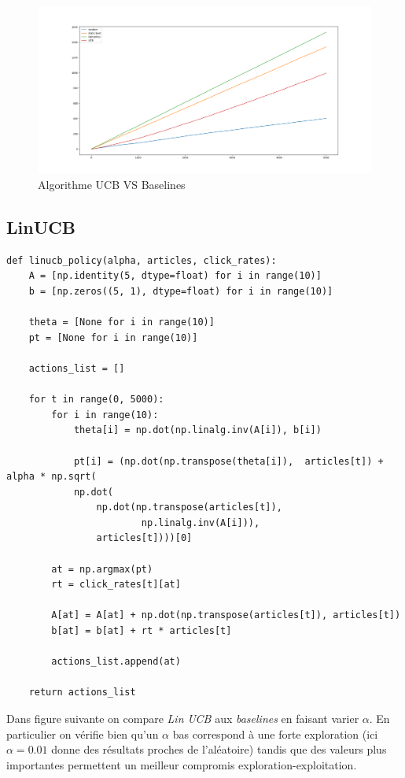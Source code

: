 \documentclass{standalone}
\begin{document}
		\begin{figure}[H]
		\centering
		\includegraphics[scale=0.3]{img/ucb.png}
		\caption{Algorithme UCB VS Baselines}
	\end{figure}
	
	\subsection{LinUCB}
	
	\begin{verbatim}
def linucb_policy(alpha, articles, click_rates):
	A = [np.identity(5, dtype=float) for i in range(10)]
	b = [np.zeros((5, 1), dtype=float) for i in range(10)]

	theta = [None for i in range(10)]
	pt = [None for i in range(10)]

	actions_list = []

	for t in range(0, 5000):
		for i in range(10):
			theta[i] = np.dot(np.linalg.inv(A[i]), b[i])

			pt[i] = (np.dot(np.transpose(theta[i]),  articles[t]) + alpha * np.sqrt(
			np.dot(
				np.dot(np.transpose(articles[t]),
						np.linalg.inv(A[i])),
				articles[t])))[0]

		at = np.argmax(pt)
		rt = click_rates[t][at]

		A[at] = A[at] + np.dot(np.transpose(articles[t]), articles[t])
		b[at] = b[at] + rt * articles[t]

		actions_list.append(at)

	return actions_list
	\end{verbatim}
	
	Dans figure suivante on compare \emph{Lin UCB} aux \emph{baselines} en faisant varier $\alpha$. En particulier on vérifie bien qu'un $\alpha$ bas correspond à une forte exploration (ici $\alpha = 0.01$ donne des résultats proches de l'aléatoire) tandis que des valeurs plus importantes permettent un meilleur compromis exploration-exploitation.
	
\end{document}
